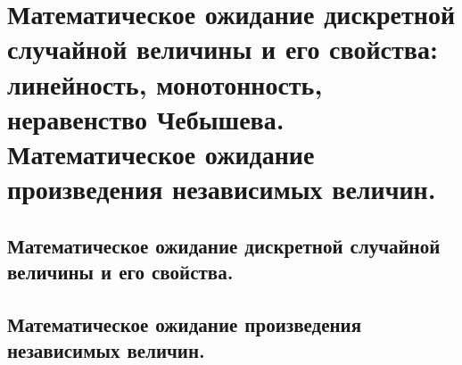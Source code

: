 \section{Математическое ожидание дискретной случайной величины и его свойства: линейность, монотонность, неравенство Чебышева. Математическое ожидание произведения независимых величин.}

\subsection{Математическое ожидание дискретной случайной величины и его свойства.}

\subsection{Математическое ожидание произведения независимых величин.}
